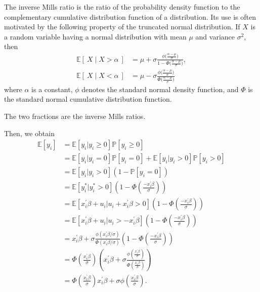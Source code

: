 \begin{note}
    The inverse Mills ratio is the ratio of the 
    probability density function to the complementary 
    cumulative distribution function of a distribution. 
    Its use is often motivated by the following property 
    of the truncated normal distribution. 
    If $X$ is a random variable having a normal distribution 
    with mean $\mu$ and variance $\sigma^2$, then
    \begin{align*}
        \mathbb{E}[\:X\mid X>\alpha\:]&=\mu+\sigma\frac{\phi\Big(\frac{\alpha-\mu}\sigma\Big)}{1-\Phi\Big(\frac{\alpha-\mu}\sigma\Big)},\\
        \mathbb{E}[\:X\mid X<\alpha\:]&=\mu-\sigma\frac{\phi\Big(\frac{\alpha-\mu}\sigma\Big)}{\Phi\Big(\frac{\alpha-\mu}\sigma\Big)}
    \end{align*}
    where $\alpha$ is a constant, 
    $\phi$ denotes the standard normal density function, 
    and $\Phi$ is the standard normal cumulative distribution function.

    The two fractions are the inverse Mills ratios.
\end{note}

Then, we obtain
\begin{align*}
    \mathbb{E}[y_i] &= \mathbb{E}[y_i|y_i \geq 0] \mathbb{P}[y_i \geq 0] \\
    &= \mathbb{E}[y_i|y_i = 0]\mathbb{P}[y_i = 0] + \mathbb{E}[y_i|y_i > 0]\mathbb{P}[y_i > 0]\\
    &= \mathbb{E}[y_i|y_i > 0](1-\mathbb{P}[y_i = 0])\\
    &= \mathbb{E}[y_i^*|y_i^*>0]\left(1-\Phi\left(\frac{-x_i^{\prime} \beta}{\sigma}\right)\right)\\
    &= \mathbb{E}[x_i^{\prime} \beta + u_i|u_i +x_i^{\prime} \beta>0]\left(1-\Phi\left(\frac{-x_i^{\prime} \beta}{\sigma}\right)\right)\\
    &= \mathbb{E}[x_i^{\prime} \beta + u_i|u_i > -x_i^{\prime} \beta]\left(1-\Phi\left(\frac{-x_i^{\prime} \beta}{\sigma}\right)\right)\\
    &= x_i^{\prime} \beta + \sigma \frac{\phi(x_i^{\prime} \beta/\sigma)}{\Phi(x_i^{\prime} \beta/\sigma)}\left(1-\Phi\left(\frac{-x_i^{\prime} \beta}{\sigma}\right)\right)\\
    &= \Phi\left(\frac{x_i^{\prime} \beta}{\sigma}\right)\left(x_i^{\prime} \beta +\sigma \frac{\phi\left(\frac{x_i^{\prime} \beta}{\sigma}\right)}{\Phi\left(\frac{x_i^{\prime} \beta}{\sigma}\right)}\right)\\
    &= \Phi \left(\frac{x_i^{\prime} \beta}{\sigma}\right) x_i^{\prime} \beta +\sigma \phi\left(\frac{x_i^{\prime} \beta}{\sigma}\right).
\end{align*}


